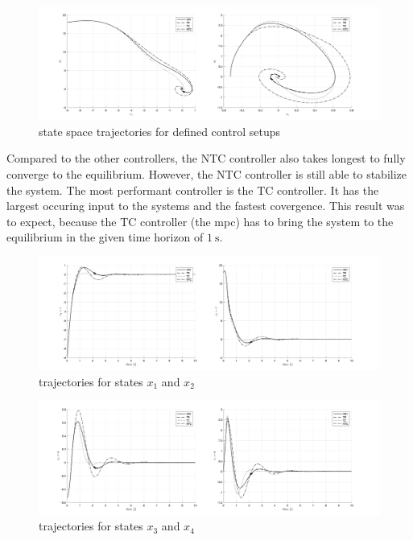 \documentclass[10pt,a4paper]{article}
\begin{document}
\begin{figure}[h]
	\begin{center}
		\includegraphics[width=\textwidth]{img/bb_states.png}
		\caption{state space trajectories for defined control setups}
		\label{pic:bb_state_space}
	\end{center}
\end{figure}

Compared to the other controllers, the NTC controller also takes longest to fully converge to the equilibrium. However, the NTC controller is still able to
stabilize the system. The most performant controller is the TC controller. It has the largest occuring input to the systems  and the fastest covergence.
This result was to expect, because the TC controller (the \gls{mpc}) has to bring the system to the equilibrium in the given time horizon of $\SI{1}{\second}$. 

\begin{figure}[h]
	\begin{center}
		\includegraphics[width=\textwidth]{img/bb_time_x1x2.png}
		\caption{trajectories for states $x_1$ and $x_2$}
		\label{pic:bb_time_x1x2}
	\end{center}
\end{figure}

\begin{figure}[h]
	\begin{center}
		\includegraphics[width=\textwidth]{img/bb_time_x3x4.png}
		\caption{trajectories for states $x_3$ and $x_4$}
		\label{pic:bb_time_x3x4}
	\end{center}
\end{figure}
\end{document}
